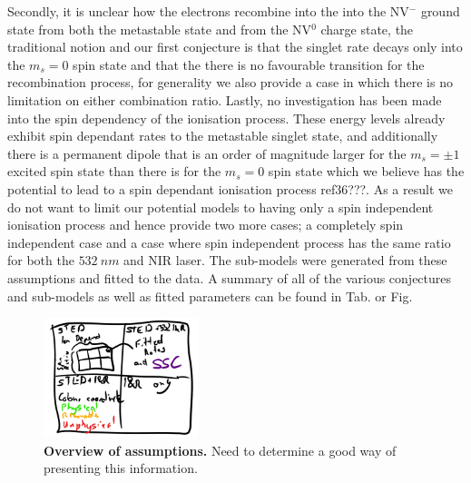 \documentclass[prl]{revtex4}
\begin{document}
Secondly, it is unclear how the electrons recombine into the into the NV$^-$ ground state from both the metastable state and from the NV$^0$ charge state, the traditional notion and our first conjecture is that the singlet rate decays only into the $m_s=0$ spin state and that the there is no favourable transition for the recombination process, for generality we also provide a case in which there is no limitation on either combination ratio.  Lastly, no investigation has been made into the spin dependency of the ionisation process. These energy levels already exhibit spin dependant rates to the metastable singlet state, and additionally there is a permanent dipole that is an order of magnitude larger for the $m_s = \pm1$ excited spin state than there is for the $m_s=0$ spin state which we believe has the potential to lead to a spin dependant ionisation process ref36???. As a result we do not want to limit our potential models to having only a spin independent ionisation process and hence provide two more cases; a completely spin independent case and a case where spin independent process has the same ratio for both the $\SI{532}{nm}$ and NIR laser. The sub-models were generated from these assumptions and fitted to the data. A summary of all of the various conjectures and sub-models as well as fitted parameters can be found in Tab. or Fig.

\begin{figure}[H]
  \centering
  \includegraphics[width=0.4\textwidth]{SubModels.png} 
 \caption{\textbf{Overview of assumptions.} Need to determine a good way of presenting this information.} \label{FigSubModels}
\end{figure}
\end{document}
